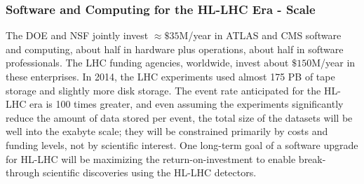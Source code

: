 \begin{frame}
\frametitle{Software and Computing for the HL-LHC Era - Scale}

The DOE and NSF jointly invest $ \approx \$ 35 $M/year in
ATLAS and CMS software and computing, about half in hardware plus operations,
about half in software professionals.
The LHC funding agencies, worldwide, invest about $ \$ 150 $M/year
in these enterprises.
In 2014, the LHC experiments used almost 175 PB of tape storage and
slightly more disk storage.
The event rate anticipated for the HL-LHC era is 100 times greater,
and even assuming the experiments significantly reduce the
amount of data stored per event,
the total size of the datasets will be well into the exabyte
scale;
they will be constrained primarily by costs and funding levels,
not by scientific interest.
One long-term goal of a software upgrade for HL-LHC
will be
maximizing the return-on-investment to enable break-through
scientific discoveries using the  HL-LHC detectors.


\end{frame}



